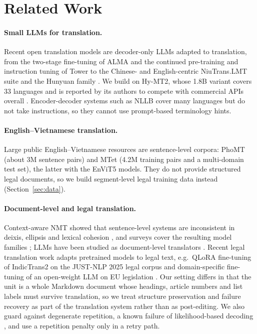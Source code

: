\section{Related Work}
\label{sec:related}

\paragraph{Small LLMs for translation.}
Recent open translation models are decoder-only LLMs adapted to translation, from the two-stage fine-tuning of ALMA \citep{xu2024alma} and the continued pre-training and instruction tuning of Tower \citep{alves2024tower} to the Chinese- and English-centric NiuTrans.LMT suite \citep{luo2025lmt} and the Hunyuan family \citep{zheng2025hunyuanmt}.
We build on Hy-MT2, whose 1.8B variant covers 33 languages and is reported by its authors to compete with commercial APIs overall \citep{zheng2026hymt2}.
Encoder-decoder systems such as NLLB \citep{nllb2022} cover many languages but do not take instructions, so they cannot use prompt-based terminology hints.

\paragraph{English--Vietnamese translation.}
Large public English--Vietnamese resources are sentence-level corpora: PhoMT \citep{doan2021phomt} (about 3M sentence pairs) and MTet \citep{ngo2022mtet} (4.2M training pairs and a multi-domain test set), the latter with the EnViT5 models.
They do not provide structured legal documents, so we build segment-level legal training data instead (Section~\ref{sec:data}).

\paragraph{Document-level and legal translation.}
Context-aware NMT showed that sentence-level systems are inconsistent in deixis, ellipsis and lexical cohesion \citep{voita2019good}, and surveys cover the resulting model families \citep{maruf2019survey}; LLMs have been studied as document-level translators \citep{wang2023document}.
Recent legal translation work adapts pretrained models to legal text, e.g.\ QLoRA fine-tuning of IndicTrans2 on the JUST-NLP 2025 legal corpus \citep{singh2025indictrans} and domain-specific fine-tuning of an open-weight LLM on EU legislation \citep{lorini2026eu}.
Our setting differs in that the unit is a whole Markdown document whose headings, article numbers and list labels must survive translation, so we treat structure preservation and failure recovery as part of the translation system rather than as post-editing.
We also guard against degenerate repetition, a known failure of likelihood-based decoding \citep{holtzman2020curious}, and use a repetition penalty \citep{keskar2019ctrl} only in a retry path.
